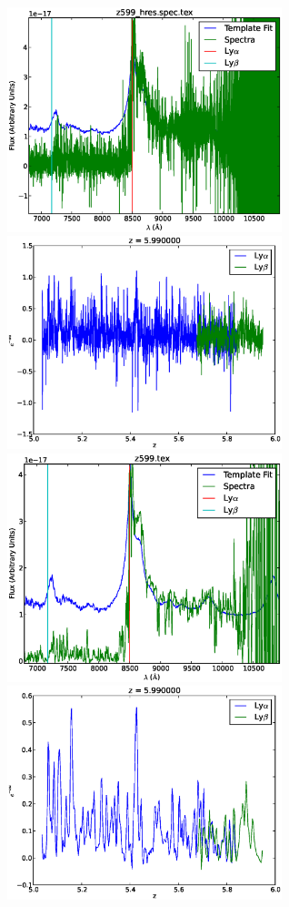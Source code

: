 \documentclass[11pt]{article}
\begin{document}
\begin{figure}[h]
  \centering
  \includegraphics[width=8cm]{z599_hres.spec.eps}
  \includegraphics[width=8cm]{z599_hres.spec_Transmission.eps}
  \includegraphics[width=8cm]{z599.eps}
  \includegraphics[width=8cm]{z599_Transmission.eps}

\end{figure}
\end{document}
